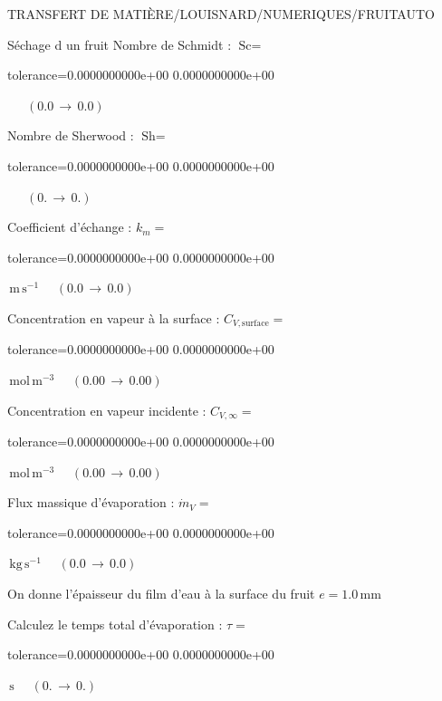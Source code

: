 \documentclass[12pt]{article}
\begin{document}
\begin{quiz}{TRANSFERT DE MATIÈRE/LOUISNARD/NUMERIQUES/FRUITAUTO}
\begin{cloze}{Séchage d un fruit}
Nombre de Schmidt : $\text{Sc} =  $
\begin{numerical}[points=1] 
\item[tolerance={0.0000000000e+00}] 0.0000000000e+00 
\end{numerical} 
 $\,$ 
 $ \quad (0.0 \, \rightarrow \, 0.0) $ 

Nombre de Sherwood : $\text{Sh} =  $
\begin{numerical}[points=2] 
\item[tolerance={0.0000000000e+00}] 0.0000000000e+00 
\end{numerical} 
 $\,$ 
 $ \quad (0. \, \rightarrow \, 0.) $ 

Coefficient d'échange : $k_m =  $
\begin{numerical}[points=1] 
\item[tolerance={0.0000000000e+00}] 0.0000000000e+00 
\end{numerical} 
 $\,  \mathrm{m}\,  \mathrm{s}^{-1}$ 
 $ \quad (0.0 \, \rightarrow \, 0.0) $ 

Concentration en vapeur à la surface : $C_{V, \text{surface}} =  $
\begin{numerical}[points=2] 
\item[tolerance={0.0000000000e+00}] 0.0000000000e+00 
\end{numerical} 
 $\,  \mathrm{mol}\,  \mathrm{m}^{-3}$ 
 $ \quad (0.00 \, \rightarrow \, 0.00) $ 

Concentration en vapeur incidente : $C_{V, \infty} =  $
\begin{numerical}[points=2] 
\item[tolerance={0.0000000000e+00}] 0.0000000000e+00 
\end{numerical} 
 $\,  \mathrm{mol}\,  \mathrm{m}^{-3}$ 
 $ \quad (0.00 \, \rightarrow \, 0.00) $ 

Flux massique d'évaporation : $\dot{m}_V =  $
\begin{numerical}[points=1] 
\item[tolerance={0.0000000000e+00}] 0.0000000000e+00 
\end{numerical} 
 $\,  \mathrm{kg}\,  \mathrm{s}^{-1}$ 
 $ \quad (0.0 \, \rightarrow \, 0.0) $ 

 

On donne l'épaisseur du film d'eau à la surface du fruit $e = 1.0\,  \mathrm{mm} $

Calculez le temps total d'évaporation : $\tau =  $
\begin{numerical}[points=2] 
\item[tolerance={0.0000000000e+00}] 0.0000000000e+00 
\end{numerical} 
 $\,  \mathrm{s}$ 
 $ \quad (0. \, \rightarrow \, 0.) $ 

\end{cloze} 


\end{quiz}
\end{document}
